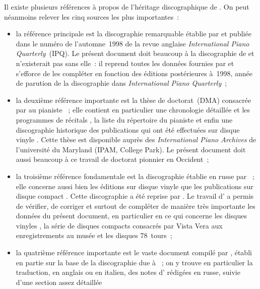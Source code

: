 Il existe plusieurs références à propos de l'héritage discographique de
\VSofronitsky{}.
On peut néanmoins relever les cinq sources les plus importantes~:
\begin{itemize}
 \item
 la référence principale est la discographie remarquable établie par
 \FMalik{} \citep[voir][]{Malik} et publiée dans le numéro de l'automne~1998
 de la revue anglaise \emph{International Piano Quarterly}~(IPQ).
 Le présent document doit beaucoup à la discographie de \FMalik{} et
 n'existerait pas sans elle~: il reprend toutes les données fournies par
 \FMalik{} et s'efforce de les compléter en fonction des éditions
 postérieures à~1998, année de parution de la discographie dans
 \emph{International Piano Quarterly}~;
 \item
 la deuxième référence importante est la thèse de doctorat~(DMA) consacrée
 par \EWhite{} au pianiste \citep[voir][]{White}~; elle contient en
 particulier une chronologie détaillée et les programmes de récitals
 \citep[voir][p.~40-71]{White}, la liste du répertoire du pianiste
 \citep[voir][p.~72-82]{White} et enfin une discographie historique des
 publications qui ont été effectuées sur disque vinyle
 \citep[voir][p.~83-107]{White}.
 Cette thèse est disponible auprès des \emph{International Piano Archives}
 de l'université du Maryland (IPAM, College Park).
 Le présent document doit aussi beaucoup à ce travail de doctorat pionnier
 en Occident~;
 \item
 la troisième référence fondamentale est la discographie établie en russe
 par \INikonovich{} \citep[voir][]{Nikonovich11}~; elle concerne aussi bien
 les éditions sur disque vinyle \citep[voir][\hbox{p.~1-11}]{Nikonovich11}
 que les publications sur disque compact
 \citep[voir][p.~11-30]{Nikonovich11}.
 Cette discographie a été reprise par \citet[p.~375-392]{Scriabine}.
 Le travail d'\INikonovich{} a permis de vérifier, de corriger et surtout de
 compléter de manière très importante les données du présent document, en
 particulier en ce qui concerne les disques vinyles , la série
 de disques compacts consacrés par Vista Vera aux enregistrements au musée
 \Scriabine{} et les disques 78~tours~;
 \item
 la quatrième référence importante est le vaste document compilé par
 \ARossi{} \citep[voir][]{Rossi}, établi en partie sur la base de la
 discographie due à \INikonovich{} \citep[voir][]{Nikonovich11}~; on y
 trouve en particulier la traduction, en anglais ou en italien, des notes
 d'\INikonovich{} rédigées en russe, suivie d'une section assez détaillée

\end{itemize}
